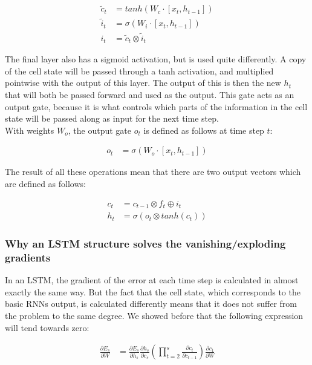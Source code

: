 \begin{align}
    \tilde{c}_t &= tanh(W_c \cdot [x_t,h_{t-1}]) \\
    \tilde{i}_t &= \sigma (W_i \cdot [x_t,h_{t-1}]) \\
    i_t &= \tilde{c}_t \otimes \tilde{i}_t
\end{align}

\noindent
The final layer also has a sigmoid activation, but is used quite differently. A copy of the cell state will be passed through a tanh activation, and multiplied pointwise with the output of this layer. The output of this is then the new $h_t$ that will both be passed forward and used as the output. This gate acts as an output gate, because it is what controls which parts of the information in the cell state will be passed along as input for the next time step.\\

\noindent
With weights $W_o$, the output gate $o_t$ is defined as follows at time step $t$:

\begin{align}
    o_t &= \sigma(W_o \cdot [x_t,h_{t-1}])
\end{align}

\noindent
The result of all these operations mean that there are two output vectors which are defined as follows:

\begin{align}
    c_t &= c_{t-1} \otimes f_t \oplus i_t \\
    h_t &= \sigma (o_t \otimes tanh (c_t))
\end{align}

\subsubsection{Why an LSTM structure solves the vanishing/exploding gradients}
In an LSTM, the gradient of the error at each time step is calculated in almost exactly the same way. But the fact that the cell state, which corresponds to the basic RNNs output, is calculated differently means that it does not suffer from the problem to the same degree. We showed before that the following expression will tend towards zero:

\begin{align}
    \frac{\partial E_s}{\partial W} &= \frac{\partial E_s}{\partial h_s}\frac{\partial h_s}{\partial c_s} \left(\prod_{t=2}^s\frac{\partial c_t}{\partial c_{t-1}} \right) \frac{\partial c_1} {\partial W}
\end{align}

